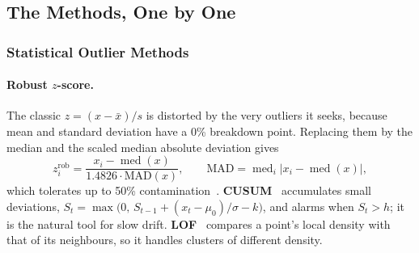 \subsection{The Methods, One by One}
\label{g1-sec:methods}

\subsubsection{Statistical Outlier Methods}
\paragraph{Robust $z$-score.} The classic $z=(x-\bar x)/s$ is distorted by the very outliers it seeks,
because mean and standard deviation have a 0\% breakdown point. Replacing them by the median and the scaled
median absolute deviation gives
\begin{equation}
  z_i^{\mathrm{rob}}=\frac{x_i-\operatorname{med}(x)}{1.4826\cdot\mathrm{MAD}(x)},\qquad
  \mathrm{MAD}=\operatorname{med}_i\lvert x_i-\operatorname{med}(x)\rvert,
\end{equation}
which tolerates up to 50\% contamination~\cite{rousseeuw,leys}. \textbf{CUSUM}~\cite{page} accumulates small
deviations, $S_t=\max\bigl(0,\,S_{t-1}+(x_t-\mu_0)/\sigma-k\bigr)$, and alarms when $S_t>h$; it is the
natural tool for slow drift. \textbf{LOF}~\cite{lof} compares a point's local density with that of its
neighbours, so it handles clusters of different density.

